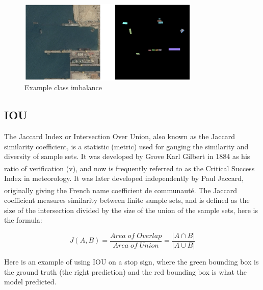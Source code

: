 \vspace{0.1in}

\begin{figure}[H]
\centering
  \vspace{-0.1in}
    \centerline{\includegraphics[width = 3.4in]{../images/class_imbalance.png}}
    \caption{Example class imbalance}
\end{figure}

\subsection{IOU}
\hspace{\parindent}
The Jaccard Index or Intersection Over Union, also known as the Jaccard similarity coefficient, is a statistic (metric) used for gauging the similarity and diversity of sample sets. It was developed by Grove Karl Gilbert in 1884 as his ratio of verification (v),\textsuperscript{\cite{murphy1996finley}} and now is frequently referred to as the Critical Success Index in meteorology. It was later developed independently by Paul Jaccard, originally giving the French name coefficient de communauté.\textsuperscript{\cite{jaccard1912distribution}} The Jaccard coefficient measures similarity between finite sample sets, and is defined as the size of the intersection divided by the size of the union of the sample sets, here is the formula:

\begin{equation}
    J(A,B) = \frac{Area\; of\; Overlap}{Area\; of\; Union} = \frac{|A \cap B|}{|A \cup B|}
\end{equation}

Here is an example of using IOU on a stop sign, where the green bounding box is the ground truth (the right prediction) and the red bounding box is what the model predicted.

\vspace{0.1in}

